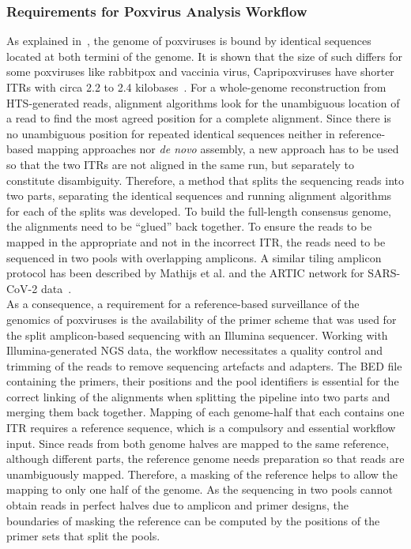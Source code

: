 \subsubsection{Requirements for Poxvirus Analysis Workflow}
As explained in~, the genome of poxviruses is bound by identical sequences located at both termini of the genome. It is shown that the size of such differs for some poxviruses like rabbitpox and vaccinia virus, Capripoxviruses have shorter \acp{ITR} with circa 2.2 to 2.4 kilobases~\cite{wittek1978inverted}. For a whole-genome reconstruction from \ac{HTS}-generated reads, alignment algorithms look for the unambiguous location of a read to find the most agreed position for a complete alignment. Since there is no unambiguous position for repeated identical sequences neither in reference-based mapping approaches nor \textit{de novo} assembly, a new approach has to be used so that the two \acp{ITR} are not aligned in the same run, but separately to constitute disambiguity. Therefore, a method that splits the sequencing reads into two parts, separating the identical sequences and running alignment algorithms for each of the splits was developed. To build the full-length consensus genome, the alignments need to be ``glued'' back together. To ensure the reads to be mapped in the appropriate and not in the incorrect \ac{ITR}, the reads need to be sequenced in two pools with overlapping amplicons. A similar tiling amplicon protocol has been described by Mathijs et al. and the ARTIC network for \ac{SARS-CoV-2} data~\cite{tyson2020improvements, mathijs2022robust}. \\
As a consequence, a requirement for a reference-based surveillance of the genomics of poxviruses is the availability of the primer scheme that was used for the split amplicon-based sequencing with an Illumina sequencer. Working with Illumina-generated \ac{NGS} data, the workflow necessitates a quality control and trimming of the reads to remove sequencing artefacts and adapters. The \ac{BED} file containing the primers, their positions and the pool identifiers is essential for the correct linking of the alignments when splitting the pipeline into two parts and merging them back together. Mapping of each genome-half that each contains one \ac{ITR} requires a reference sequence, which is a compulsory and essential workflow input. Since reads from both genome halves are mapped to the same reference, although different parts, the reference genome needs preparation so that reads are unambiguously mapped. Therefore, a masking of the reference helps to allow the mapping to only one half of the genome. As the sequencing in two pools cannot obtain reads in perfect halves due to amplicon and primer designs, the boundaries of masking the reference can be computed by the positions of the primer sets that split the pools. \\
